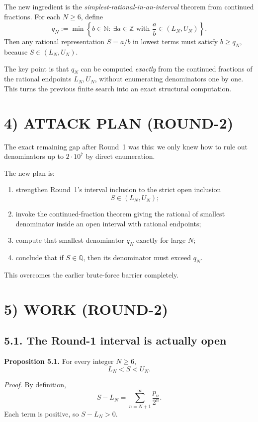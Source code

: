 The new ingredient is the \emph{simplest-rational-in-an-interval} theorem from continued fractions.
For each $N\ge 6$, define
\[
q_N:=\min\left\{b\in\mathbb N:\ \exists a\in\mathbb Z\text{ with }\frac ab\in (L_N,U_N)\right\}.
\]
Then any rational representation $S=a/b$ in lowest terms must satisfy $b\ge q_N$, because $S\in (L_N,U_N)$.

The key point is that $q_N$ can be computed \emph{exactly} from the continued fractions of the rational endpoints $L_N,U_N$, without enumerating denominators one by one. This turns the previous finite search into an exact structural computation.

\section*{4) ATTACK PLAN (ROUND-2)}

The exact remaining gap after Round~1 was this: we only knew how to rule out denominators up to $2\cdot 10^7$ by direct enumeration.

The new plan is:
\begin{enumerate}
\item strengthen Round~1's interval inclusion to the strict open inclusion
\[
S\in (L_N,U_N);
\]
\item invoke the continued-fraction theorem giving the rational of smallest denominator inside an open interval with rational endpoints;
\item compute that smallest denominator $q_N$ exactly for large $N$;
\item conclude that if $S\in\mathbb Q$, then its denominator must exceed $q_N$.
\end{enumerate}

This overcomes the earlier brute-force barrier completely.

\section*{5) WORK (ROUND-2)}

\subsection*{5.1. The Round-1 interval is actually open}

\medskip
\noindent\textbf{Proposition 5.1.}
For every integer $N\ge 6$,
\[
L_N<S<U_N.
\]

\emph{Proof.}
By definition,
\[
S-L_N=\sum_{n=N+1}^{\infty}\frac{p_n}{2^n}.
\]
Each term is positive, so $S-L_N>0$.

